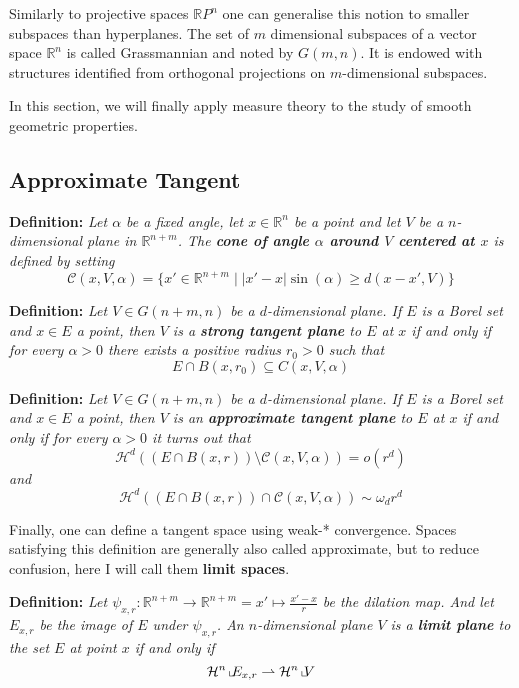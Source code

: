 Similarly to projective spaces $\mathbb{R}P^n$ one can generalise this notion to
smaller subspaces than hyperplanes. The set of $m$ dimensional subspaces of a
vector space $\mathbb{R}^n$ is called Grassmannian and noted by $G(m,n)$. It is
endowed with structures identified from orthogonal projections on
$m$-dimensional subspaces.

\vspace{2ex}
In this section, we will finally apply measure theory to the study of smooth
geometric properties.

\subsection{Approximate Tangent}

\textbf{Definition:} \textit{Let $\alpha$ be a fixed angle, let $x\in\mathbb R^n$
be a point and let $V$ be a $n$-dimensional plane in $\mathbb R^{n+m}$. The \textbf{
cone of angle $\alpha$ around $V$ centered at $x$} is defined by setting
\[\mathcal C(x,V,\alpha)=\{x'\in\mathbb R^{n+m}\;|\; |x′−x|\sin(\alpha)\geq d(x−x′, V)\}\]
}

\vspace{2ex}
\textbf{Definition:} \textit{Let $V\in G(n+m, n)$ be a $d$-dimensional plane.
If $E$ is a Borel set and $x\in E$ a point, then $V$ is a \textbf{strong tangent plane}
to $E$ at $x$ if and only if for every $\alpha >0$ there exists a positive
radius $r_0 >0$ such that
\[E∩B(x, r_0)\subseteq C(x, V, \alpha)\]
}

\vspace{2ex}
\textbf{Definition:} \textit{Let $V\in G(n+m, n)$ be a $d$-dimensional plane.
If $E$ is a Borel set and $x\in E$ a point, then $V$ is an \textbf{approximate tangent
plane} to $E$ at $x$ if and only if for every $\alpha>0$ it turns out that
\[\mathcal H^d((E∩B(x,r))\setminus\mathcal C(x, V, \alpha)) = o(r^d)\]
and
\[\mathcal H^d((E∩B(x, r))∩\mathcal C(x, V, α))\sim \omega_dr^d\]
}

\vspace{2ex}
Finally, one can define a tangent space using weak-* convergence. Spaces
satisfying this definition are generally also called approximate, but to reduce
confusion, here I will call them \textbf{limit spaces}.

\vspace{1ex}
\textbf{Definition:} \textit{Let $\psi_{x,r}:\mathbb R^{n+m}\rightarrow \mathbb
R^{n+m}=x'\mapsto \frac{x'-x}{r}$ be the dilation map. And let $E_{x,r}$ be the
image of $E$ under $\psi_{x,r}$. An $n$-dimensional plane $V$ is a
\textbf{limit plane} to the set $E$ at point $x$ if and only if
\[\mathcal H^n\,\llcorner\hspace{-1mm}E_{x,r}\rightharpoonup\mathcal H^n\,\llcorner\hspace{-1mm}V\]}

